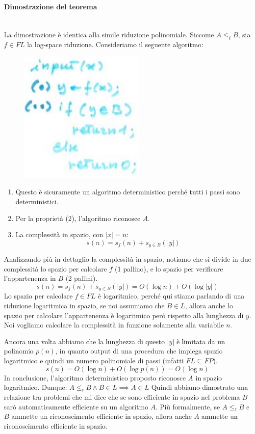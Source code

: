 \documentclass{article}
\begin{document}
\paragraph{Dimostrazione del teorema}\mbox{}\\
La dimostrazione è identica alla simile riduzione polinomiale. Siccome $A\leq_{\ell}B$, sia
$f\in FL$ la log-space riduzione. Consideriamo il seguente algoritmo:
\begin{figure}[H]
    \centering
    \includegraphics[scale=0.6]{images/algo_det_daf.png}
\end{figure}
\begin{enumerate}
    \item Questo è sicuramente un algoritmo deterministico perché tutti i passi
    sono deterministici.
    \item Per la proprietà (2), l'algoritmo riconosce $A$.
    \item La complessità in spazio, con $|x|=n$: 
    $$s(n)=s_f(n)+s_{y\in B}(|y|)$$
\end{enumerate}
Analizzando più in dettaglio la complessità in spazio, notiamo che si divide in due
complessità lo spazio per calcolare $f$ (1 pallino), e lo spazio per verificare
l'appartenenza in $B$ (2 pallini).
$$s(n)=s_f(n)+s_{y\in B}(|y|)=O(\log n)+O(\log |y|)$$
Lo spazio per calcolare $f\in FL$ è logaritmico, perché qui stiamo parlando di una riduzione logaritmica
in spazio, se noi assumiamo che $B\in L$, allora anche lo spazio per calcolare l'appartenenza
è logaritmico però rispetto alla lunghezza di $y$. Noi vogliamo calcolare la complessità
in funzione solamente alla variabile $n$.

Ancora una volta abbiamo che la lunghezza di questo $|y|$ è limitata da un polinomio $p(n)$, in
quanto output di una procedura che impiega spazio logaritmico e quindi un numero polinomiale di
passi (infatti $FL\subseteq FP$).
$$s(n)=O(\log n)+O(\log p(n))=O(\log n)$$
In conclusione, l'algoritmo deterministico proposto riconosce $A$ in spazio logaritmico.
Dunque: $A\leq_{\ell}B\land B\in L\implies A\in L$
Quindi abbiamo dimostrato una relazione tra problemi che mi dice che se sono efficiente in spazio
nel problema $B$ sarò automaticamente efficiente su un algoritmo $A$. Più formalmente, se
$A\leq_{\ell}B$ e $B$ ammette un riconoscimento efficiente in spazio, allora anche $A$ ammette un
riconoscimento efficiente in spazio.
\end{document}
